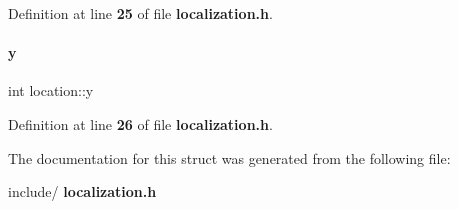 Definition at line \textbf{ 25} of file \textbf{ localization.\+h}.

\mbox{\label{a00179_ad7197d1981d4ea5d8b36041473cac815}} 
\paragraph{y}
{\footnotesize\ttfamily int location\+::y}



Definition at line \textbf{ 26} of file \textbf{ localization.\+h}.



The documentation for this struct was generated from the following file\+:\begin{DoxyCompactItemize}
\item 
include/\textbf{ localization.\+h}\end{DoxyCompactItemize}
